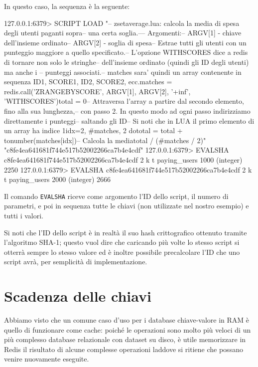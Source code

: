 In questo caso, la sequenza è la seguente:

\begin{commentedsource}[style=redis]
127.0.0.1:6379> SCRIPT LOAD "-- zsetaverage.lua: calcola la media di spesa degli utenti paganti sopra\n-- una certa soglia.\n--\n-- Argomenti:\n--     ARGV[1] - chiave dell'insieme ordinato\n--     ARGV[2] - soglia di spesa\n\n-- Estrae tutti gli utenti con un punteggio maggiore a quello specificato.\n-- L'opzione WITHSCORES dice a redis di tornare non solo le stringhe\n-- dell'insieme ordinato (quindi gli ID degli utenti) ma anche i \n-- punteggi associati.\n-- matches sara' quindi un array contenente in sequenza ID1, SCORE1, ID2, SCORE2, ecc.\nlocal matches = redis.call('ZRANGEBYSCORE', ARGV[1], ARGV[2], '+inf', 'WITHSCORES')\n\nlocal total = 0\n\n-- Attraversa l'array a partire dal secondo elemento, fino alla sua lunghezza,\n-- con passo 2. In questo modo ad ogni passo indirizziamo direttamente i punteggi\n-- saltando gli ID\n-- Si noti che in LUA il primo elemento di un array ha indice 1\nfor idx=2, #matches, 2 do\n    total = total + tonumber(matches[idx])\nend\n\n-- Calcola la media\nreturn total / (#matches / 2)\n"
"c8fe4ea641681f744e517b52002266ca7b4e4cdf"
127.0.0.1:6379> EVALSHA c8fe4ea641681f744e517b52002266ca7b4e4cdf 2 k t paying_users 1000
(integer) 2250
127.0.0.1:6379> EVALSHA c8fe4ea641681f744e517b52002266ca7b4e4cdf 2 k t paying_users 2000
(integer) 2666
\end{commentedsource}

Il comando \verb|EVALSHA| riceve come argomento l'ID dello script, il numero di parametri, e poi
in sequenza tutte le chiavi (non utilizzate nel nostro esempio) e tutti i valori. 

Si noti che l'ID dello script è in realtà il suo hash crittografico ottenuto tramite l'algoritmo
SHA-1; questo vuol dire che caricando più volte lo stesso script si otterrà sempre lo stesso valore
ed è inoltre possibile precalcolare l'ID che uno script avrà, per semplicità di implementazione.

\section{Scadenza delle chiavi}

Abbiamo visto che un comune caso d'uso per i database chiave-valore in RAM è quello di funzionare
come cache: poiché le operazioni sono molto più veloci di un più complesso database relazionale con
dataset su disco, è utile memorizzare in Redis il risultato di alcune complesse operazioni laddove
si ritiene che possano venire nuovamente eseguite. 

